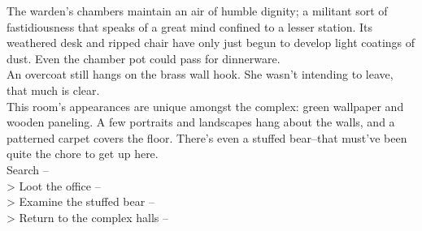The warden's chambers maintain an air of humble dignity; a militant sort of fastidiousness that speaks of a great mind confined to a lesser station. Its weathered desk and ripped chair have only just begun to develop light coatings of dust. Even the chamber pot could pass for dinnerware.\\

An overcoat still hangs on the brass wall hook. She wasn’t intending to leave, that much is clear.\\

This room's appearances are unique amongst the complex: green wallpaper and wooden paneling. A few portraits and landscapes hang about the walls, and a patterned carpet covers the floor. There’s even a stuffed bear--that must’ve been quite the chore to get up here.\\

 Search -- \\
> Loot the office -- \\
> Examine the stuffed bear -- \\
> Return to the complex halls -- 